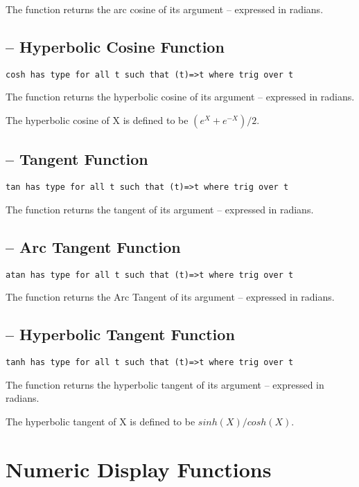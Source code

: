 The  function returns the arc cosine of its argument -- expressed in radians.

\subsection{ -- Hyperbolic Cosine Function}
\begin{lstlisting}
cosh has type for all t such that (t)=>t where trig over t
\end{lstlisting}

The  function returns the hyperbolic cosine of its argument -- expressed in radians.

The hyperbolic cosine of X is defined to be $(e^X + e^{-X})/2$.

\subsection{ -- Tangent Function}
\begin{lstlisting}
tan has type for all t such that (t)=>t where trig over t
\end{lstlisting}

The  function returns the tangent of its argument -- expressed in radians.

\subsection{ -- Arc Tangent Function}
\begin{lstlisting}
atan has type for all t such that (t)=>t where trig over t
\end{lstlisting}

The  function returns the Arc Tangent of its argument -- expressed in radians.

\subsection{ -- Hyperbolic Tangent Function}
\begin{lstlisting}
tanh has type for all t such that (t)=>t where trig over t
\end{lstlisting}

The  function returns the hyperbolic tangent of its argument -- expressed in radians.

The hyperbolic tangent of X is defined to be $sinh(X)/cosh(X)$.

\section{Numeric Display Functions}
\label{numberDisplay}

